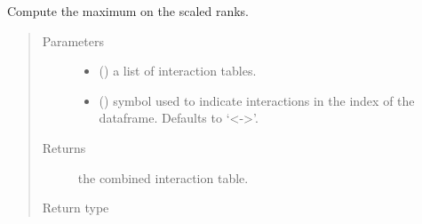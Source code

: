 \documentclass[letterpaper,10pt,english]{sphinxmanual}
\begin{document}
\begin{fulllineitems}
\label{\detokenize{_modules/cosifer.combiners:cosifer.combiners.cit.max_scaled_ranks_table}}
Compute the maximum on the scaled ranks.
\begin{quote}\begin{description}
\item[{Parameters}] \leavevmode\begin{itemize}
\item {} 
 () \textendash{} a list of interaction tables.

\item {} 
 (\sphinxstyleliteralemphasis{\sphinxupquote{, }}) \textendash{} symbol used to indicate
interactions in the index of the dataframe. Defaults to ‘\textless{}-\textgreater{}’.

\end{itemize}

\item[{Returns}] \leavevmode
the combined interaction table.

\item[{Return type}] \leavevmode
{\hyperref[\detokenize{_modules/cosifer.collections:cosifer.collections.interaction_table.InteractionTable}]{}}

\end{description}\end{quote}

\end{fulllineitems}

\end{document}
